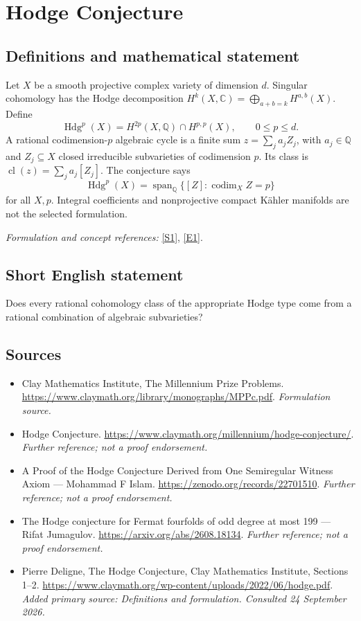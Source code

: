 \documentclass[11pt]{article}
\begin{document}
\section*{\texorpdfstring{Hodge Conjecture}{Hodge Conjecture}}\label{statement}
\subsection{Definitions and mathematical statement}
Let $X$ be a smooth projective complex variety of dimension $d$. Singular cohomology has the Hodge decomposition $H^k(X,{\mathbb{C}})=\bigoplus_{a+b=k}H^{a,b}(X)$. Define
\[
 \operatorname{Hdg}^{p}(X)=H^{2p}(X,{\mathbb{Q}})\cap H^{p,p}(X),\qquad 0\le p\le d.
\]
A rational codimension-$p$ algebraic cycle is a finite sum $z=\sum_j a_j Z_j$, with $a_j\in{\mathbb{Q}}$ and $Z_j\subseteq X$ closed irreducible subvarieties of codimension $p$. Its class is $\operatorname{cl}(z)=\sum_j a_j[Z_j]$. The conjecture says
\[
 \operatorname{Hdg}^{p}(X)=\operatorname{span}_{{\mathbb{Q}}}\{[Z]:\operatorname{codim}_X Z=p\}
\]
for all $X,p$. Integral coefficients and nonprojective compact Kähler manifolds are not the selected formulation.
\par\smallskip\textit{Formulation and concept references:} \href{https://www.claymath.org/library/monographs/MPPc.pdf}{[S1]}, \href{https://www.claymath.org/wp-content/uploads/2022/06/hodge.pdf}{[E1]}.

\subsection{Short English statement}
Does every rational cohomology class of the appropriate Hodge type come from a rational combination of algebraic subvarieties?
\subsection{Sources}
\begin{itemize}
\item[S1]Clay Mathematics Institute, The Millennium Prize Problems.
\url{https://www.claymath.org/library/monographs/MPPc.pdf}.
\textit{Formulation source.}
\item[S2]Hodge Conjecture.
\url{https://www.claymath.org/millennium/hodge-conjecture/}.
\textit{Further reference; not a proof endorsement.}
\item[S3]A Proof of the Hodge Conjecture Derived from One Semiregular Witness Axiom — Mohammad F Islam.
\url{https://zenodo.org/records/22701510}.
\textit{Further reference; not a proof endorsement.}
\item[S4]The Hodge conjecture for Fermat fourfolds of odd degree at most 199 — Rifat Jumagulov.
\url{https://arxiv.org/abs/2608.18134}.
\textit{Further reference; not a proof endorsement.}
\item[E1]Pierre Deligne, The Hodge Conjecture, Clay Mathematics Institute, Sections 1--2.
\url{https://www.claymath.org/wp-content/uploads/2022/06/hodge.pdf}.
\textit{Added primary source: Definitions and formulation. Consulted 24 September 2026.}
\end{itemize}
\end{document}
